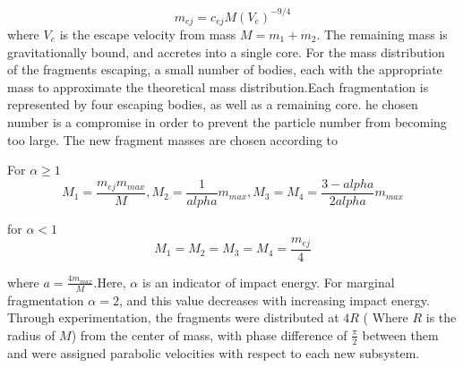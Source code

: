 \begin{equation}
m_{ej} = c_{ej}M{(V_{e})}^{-9/4}
\end{equation}
where $V_{e}$ is the escape velocity from mass $M = m_{1}+m_{2}$. The remaining mass is gravitationally bound, and accretes into a single core. For the mass distribution of the fragments escaping, a small number of bodies, each with the appropriate mass to approximate the theoretical mass distribution.Each fragmentation is represented by four escaping bodies, as well as a remaining core. he chosen number is a compromise in order to prevent the particle number from  becoming too large. The new fragment masses are chosen according to 

For $\alpha \geq 1$
\begin{equation}
M_{1} = \frac{m_{ej}m_{max}}{M}, 
M_{2} = \frac{1}{alpha} m_{max}, 
M_{3} = M_{4} = \frac {3-alpha}{2alpha} m_{max}
\end{equation}

for $\alpha < 1$
\begin{equation}
M_{1}=M_{2}=M_{3}=M_{4} = \frac{m_{ej}}{4}
\end{equation}

where $a = \frac{4m_{max}}{M}$.Here, $\alpha$ is an indicator of impact energy. For marginal fragmentation $\alpha = 2$, and
this value decreases with increasing impact energy. Through experimentation, the fragments were distributed at $4R$ ( Where $R$ is the radius of $M$) from the center of mass, with phase difference of $\frac{\pi}{2}$ between them and were assigned parabolic velocities with respect to each new subsystem.
